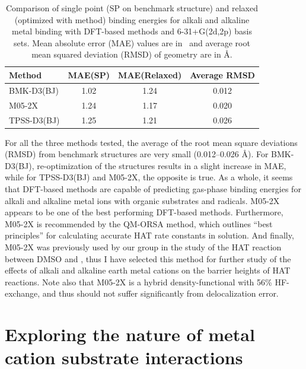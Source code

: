 \begin{table}
  \caption[Comparison of single point and relaxed binding energies for alkali and alkaline metal binding with DFT-based methods.]{Comparison of single point (SP on benchmark structure) and relaxed (optimized with method) binding energies for alkali and alkaline metal binding with DFT-based methods and 6-31+G(2d,2p) basis sets. Mean absolute error (MAE) values are in \kcalmol\ and average root mean squared deviation (RMSD) of geometry are in \AA.}\label{tab:ccsd-metal-opt}
  \begin{tabular}{l c c c}
    Method & MAE(SP) & MAE(Relaxed) & Average RMSD \\
    \hline
    BMK-D3(BJ) & 1.02 & 1.24 & 0.012 \\
    M05-2X & 1.24 & 1.17 & 0.020 \\
    TPSS-D3(BJ) & 1.25 & 1.21 & 0.026 \\
  \end{tabular}
\end{table}

For all the three methods tested, the average of the root mean square deviations (RMSD) from benchmark structures are very small (0.012--0.026 \AA). For BMK-D3(BJ), re-optimization of the structures results in a slight increase in MAE, while for TPSS-D3(BJ) and M05-2X, the opposite is true. As a whole, it seems that DFT-based methods are capable of predicting gas-phase binding energies for alkali and alkaline metal ions with organic substrates and radicals. M05-2X appears to be one of the best performing DFT-based methods. Furthermore, M05-2X is recommended by the QM-ORSA\cite{Galano2013} method, which outlines ``best principles'' for calculating accurate HAT rate constants in solution. And finally, M05-2X was previously used by our group in the study of the HAT reaction between DMSO and \bno,\cite{vanSanten2016} thus I have selected this method for further study of the effects of alkali and alkaline earth metal cations on the barrier heights of HAT reactions. Note also that M05-2X is a hybrid density-functional with 56\% HF-exchange, and thus should not suffer significantly from delocalization error.

\section{Exploring the nature of metal cation substrate interactions}

